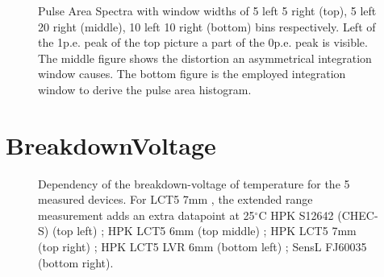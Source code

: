 \documentclass[12pt,article,type=msc,colorback,accentcolor=tud9c]{tudthesis}
\begin{document}
{\begin{figure}[h]
\centering
\label{app:PAS_window}
\end{figure}

\begin{figure}[h]
\ContinuedFloat
\begin{centering}
\caption{Pulse Area Spectra with window widths of 5 left 5 right (top), 5 left 20 right (middle), 10 left 10 right (bottom) bins respectively. Left of the 1p.e. peak of the top picture a part of the 0p.e. peak is visible. The middle figure shows the distortion an asymmetrical integration window causes. The bottom figure is the employed integration window to derive the pulse area histogram.}
\label{app:PAS_window}
\end{centering}
\end{figure}





\clearpage
\section{BreakdownVoltage}
\label{appsec:Device_Vbr}
\begin{figure}[h]
\begin{centering}
\caption{Dependency of the breakdown-voltage of temperature for the 5 measured devices. For LCT5 7mm , the extended range measurement adds an extra datapoint at 25$^\circ$C HPK S12642 (CHEC-S) (top left) ; HPK LCT5 6mm (top middle) ; HPK LCT5 7mm (top right) ; HPK LCT5 LVR 6mm (bottom left) ; SensL FJ60035 (bottom right).}
\label{app:Device_Vbr}
\end{centering}
\end{figure}

}
\end{document}
